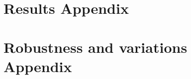 \documentclass[a4paper]{scrartcl}
\begin{document}
\newpage	
	
	\tableofcontents
	\newpage
	\listoffigures
	\newpage
	\listoftables
	\newpage
	\printglossary[title={List of Abbreviations}] %
	\newpage
	
	
	
	
	
	
	
	
	
	
	
	
	
	
	
	

	\pagebreak
	\printbibliography
	
	\begin{appendices}
	\section{Results Appendix}\label{appendix}
	
		
	
	\pagebreak
	\section{Robustness and variations Appendix}\label{appendix_2}
	

	
		
	\end{appendices}
\end{document}
